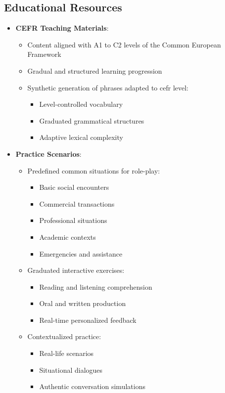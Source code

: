 \subsection{Educational Resources}
\begin{itemize}
	\item \textbf{CEFR Teaching Materials}:
	      \begin{itemize}
		      \item Content aligned with A1 to C2 levels of the Common European Framework
		      \item Gradual and structured learning progression
		      \item Synthetic generation of phrases adapted to \gls{cefr} level:
		            \begin{itemize}
			            \item Level-controlled vocabulary
			            \item Graduated grammatical structures
			            \item Adaptive lexical complexity
		            \end{itemize}
	      \end{itemize}

	\item \textbf{Practice Scenarios}:
	      \begin{itemize}
		      \item Predefined common situations for role-play:
		            \begin{itemize}
			            \item Basic social encounters
			            \item Commercial transactions
			            \item Professional situations
			            \item Academic contexts
			            \item Emergencies and assistance
		            \end{itemize}
		      \item Graduated interactive exercises:
		            \begin{itemize}
			            \item Reading and listening comprehension
			            \item Oral and written production
			            \item Real-time personalized feedback
		            \end{itemize}
		      \item Contextualized practice:
		            \begin{itemize}
			            \item Real-life scenarios
			            \item Situational dialogues
			            \item Authentic conversation simulations
		            \end{itemize}
	      \end{itemize}
\end{itemize}